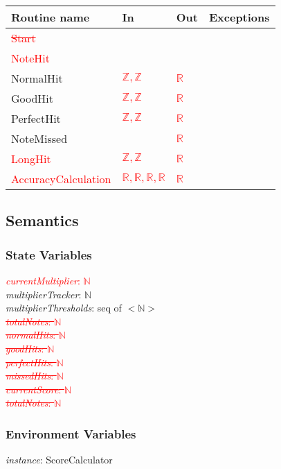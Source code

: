 \documentclass[12pt]{article}
\begin{document}
\begin{tabular}{| l | l | l | l |}
\hline
\textbf{Routine name} & \textbf{In} & \textbf{Out} & \textbf{Exceptions}\\
\hline
\textcolor{red}{\sout{Start}} & & &\\
\hline
\textcolor{red}{NoteHit} & & & \\
\hline
NormalHit & \textcolor{red}{$\mathbb{Z}, \mathbb{Z}$} & \textcolor{red}{$\mathbb{R}$} & \\
\hline
GoodHit & \textcolor{red}{$\mathbb{Z}, \mathbb{Z}$} & \textcolor{red}{$\mathbb{R}$} & \\
\hline
PerfectHit & \textcolor{red}{$\mathbb{Z}, \mathbb{Z}$} & \textcolor{red}{$\mathbb{R}$} & \\
\hline
NoteMissed & & \textcolor{red}{$\mathbb{R}$} & \\
\hline
\textcolor{red}{LongHit} & \textcolor{red}{$\mathbb{Z}, \mathbb{Z}$} & \textcolor{red}{$\mathbb{R}$} & \\
\hline
\textcolor{red}{AccuracyCalculation}&\textcolor{red}{$\mathbb{R},\mathbb{R},\mathbb{R},\mathbb{R}$}&\textcolor{red}{$\mathbb{R}$} &\\
\hline
\end{tabular}

\subsection {Semantics}

\subsubsection {State Variables}
\textcolor{red}{\textit{currentMultiplier}: $\mathbb{N}$}\\
\textit{multiplierTracker}: $\mathbb{N} $ \\
\textit{multiplierThresholds}: seq of $<\mathbb{N}>$ \\
\textcolor{red}{\sout{
\textit{totalNotes}: $\mathbb{N} $ \\
\textit{normalHits}: $\mathbb{N} $ \\
\textit{goodHits}: $\mathbb{N} $ \\
\textit{perfectHits}: $\mathbb{N} $ \\
\textit{missedHits}: $\mathbb{N} $ \\
\textit{currentScore}: $\mathbb{N} $ \\
\textit{totalNotes}: $\mathbb{N}$
}}

\subsubsection {Environment Variables}
\textit{instance}: ScoreCalculator
\end{document}
